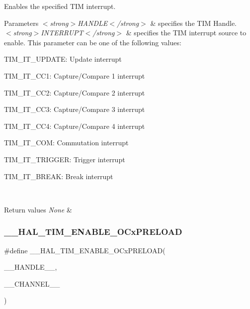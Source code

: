 Enables the specified T\+IM interrupt. 


\begin{DoxyParams}{Parameters}
{\em $<$strong$>$\+H\+A\+N\+D\+L\+E$<$/strong$>$} & specifies the T\+IM Handle. \\
\hline
{\em $<$strong$>$\+I\+N\+T\+E\+R\+R\+U\+P\+T$<$/strong$>$} & specifies the T\+IM interrupt source to enable. This parameter can be one of the following values\+: \begin{DoxyItemize}
\item T\+I\+M\+\_\+\+I\+T\+\_\+\+U\+P\+D\+A\+TE\+: Update interrupt \item T\+I\+M\+\_\+\+I\+T\+\_\+\+C\+C1\+: Capture/\+Compare 1 interrupt \item T\+I\+M\+\_\+\+I\+T\+\_\+\+C\+C2\+: Capture/\+Compare 2 interrupt \item T\+I\+M\+\_\+\+I\+T\+\_\+\+C\+C3\+: Capture/\+Compare 3 interrupt \item T\+I\+M\+\_\+\+I\+T\+\_\+\+C\+C4\+: Capture/\+Compare 4 interrupt \item T\+I\+M\+\_\+\+I\+T\+\_\+\+C\+OM\+: Commutation interrupt \item T\+I\+M\+\_\+\+I\+T\+\_\+\+T\+R\+I\+G\+G\+ER\+: Trigger interrupt \item T\+I\+M\+\_\+\+I\+T\+\_\+\+B\+R\+E\+AK\+: Break interrupt \end{DoxyItemize}
\\
\hline
\end{DoxyParams}

\begin{DoxyRetVals}{Return values}
{\em None} & \\
\hline
\end{DoxyRetVals}
\mbox{\label{group___t_i_m___exported___macros_ga199e848f0a301987a500faea0db2dd70}} 
\subsubsection{\texorpdfstring{\+\_\+\+\_\+\+H\+A\+L\+\_\+\+T\+I\+M\+\_\+\+E\+N\+A\+B\+L\+E\+\_\+\+O\+Cx\+P\+R\+E\+L\+O\+AD}{\_\_HAL\_TIM\_ENABLE\_OCxPRELOAD}}
{\footnotesize\ttfamily \#define \+\_\+\+\_\+\+H\+A\+L\+\_\+\+T\+I\+M\+\_\+\+E\+N\+A\+B\+L\+E\+\_\+\+O\+Cx\+P\+R\+E\+L\+O\+AD(\begin{DoxyParamCaption}\item[{}]{\+\_\+\+\_\+\+H\+A\+N\+D\+L\+E\+\_\+\+\_\+,  }\item[{}]{\+\_\+\+\_\+\+C\+H\+A\+N\+N\+E\+L\+\_\+\+\_\+ }\end{DoxyParamCaption})}

